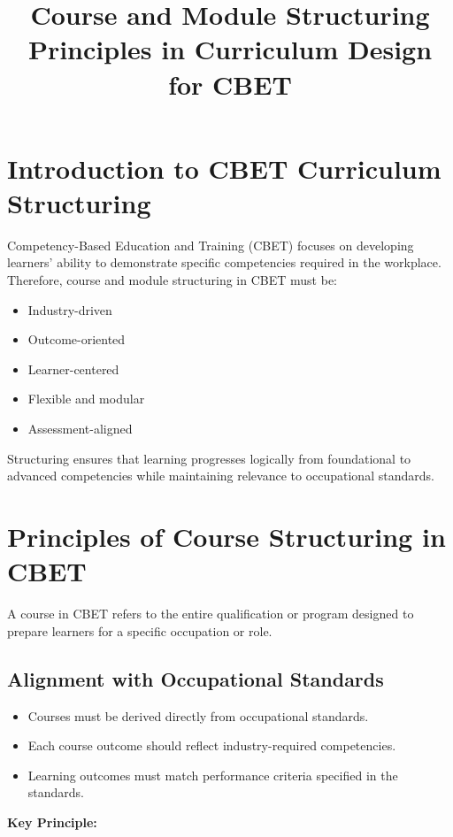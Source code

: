 \documentclass[12pt]{article}
\title{Course and Module Structuring Principles in Curriculum Design for CBET}
\date{}
\begin{document}
\maketitle

\section{Introduction to CBET Curriculum Structuring}

Competency-Based Education and Training (CBET) focuses on developing learners' ability to demonstrate specific competencies required in the workplace. Therefore, course and module structuring in CBET must be:

\begin{itemize}
    \item Industry-driven
    \item Outcome-oriented
    \item Learner-centered
    \item Flexible and modular
    \item Assessment-aligned
\end{itemize}

Structuring ensures that learning progresses logically from foundational to advanced competencies while maintaining relevance to occupational standards.

\section{Principles of Course Structuring in CBET}

A course in CBET refers to the entire qualification or program designed to prepare learners for a specific occupation or role.

\subsection{Alignment with Occupational Standards}

\begin{itemize}
    \item Courses must be derived directly from occupational standards.
    \item Each course outcome should reflect industry-required competencies.
    \item Learning outcomes must match performance criteria specified in the standards.
\end{itemize}

\textbf{Key Principle:}
\end{document}
